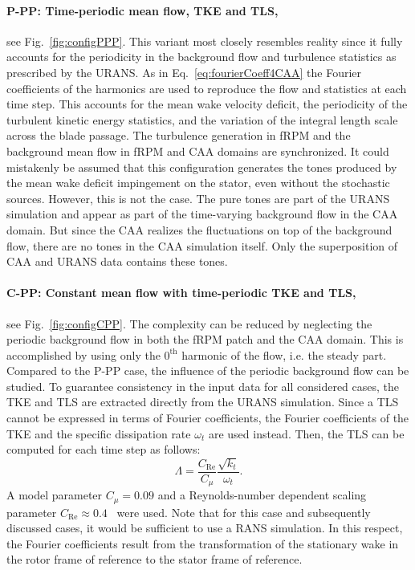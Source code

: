\paragraph{{\bf P-PP}: Time-periodic mean flow, TKE and TLS,} 
see Fig.~\ref{fig:configPPP}. 
This variant most closely resembles reality since it fully accounts for the periodicity in the background flow and turbulence statistics as prescribed by the URANS. As in Eq.~\ref{eq:fourierCoeff4CAA} the Fourier coefficients of the harmonics are used to reproduce the flow and statistics at each time step. This accounts for the mean wake velocity deficit, the periodicity of the turbulent kinetic energy statistics, and the variation of the integral length scale across the blade passage. The turbulence generation in fRPM and the background mean flow in fRPM and CAA domains are synchronized. It could mistakenly be assumed that this configuration generates the tones produced by the mean wake deficit impingement on the stator, even without the stochastic sources. However, this is not the case. The pure tones are part of the URANS simulation and appear as part of the time-varying background flow in the CAA domain. But since the CAA realizes the fluctuations on top of the background flow, there are no tones in the CAA simulation itself. Only the superposition of CAA and URANS data contains these tones. 

\paragraph{{\bf C-PP}: Constant mean flow with time-periodic TKE and TLS,}
see Fig.~\ref{fig:configCPP}.
The complexity can be reduced by neglecting the periodic background flow in both the fRPM patch and the CAA domain. This is accomplished by using only the $0^\text{th}$ harmonic of the flow, i.e. the steady part. Compared to the P-PP case, the influence of the periodic background flow can be studied. To guarantee consistency in the input data for all considered cases, the TKE and TLS are extracted directly from the URANS simulation. 
Since a TLS cannot be expressed in terms of Fourier coefficients, the Fourier coefficients of the TKE and the specific dissipation rate $\omega_t$ are used instead.  Then, the TLS can be computed for each time step as follows:
\begin{equation}\label{eq:Lambda}
\Lambda = \frac{C_\text{Re}}{C_\mu}\frac{\sqrt{k_t}}{\omega_t}.
\end{equation}
A model parameter $C_\mu=0.09$ and a Reynolds-number dependent scaling parameter $C_\text{Re} \approx 0.4$~\cite{pope_turbulent_2000} were used.
Note that for this case and subsequently discussed cases, it would be sufficient to use a RANS simulation. In this respect, the Fourier coefficients result from the transformation of the stationary wake in the rotor frame of reference to the stator frame of reference. 

